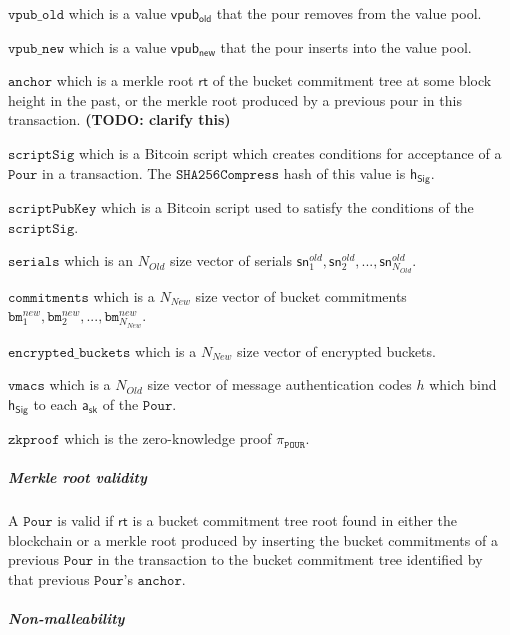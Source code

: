 \documentclass[8pt]{article}
\newcommand{\SpendAuthorityPrivate}{\mathsf{a_{sk}}}
\newcommand{\SHA}{\mathtt{SHA256Compress}}
\newcommand{\bm}{\mathbf{\mathtt{bm}}}
\newcommand{\Pour}{\mathtt{Pour}}
\newcommand{\sn}{\mathsf{sn}}
\newcommand{\vpubOld}{\mathtt{vpub\_old}}
\newcommand{\vpubNew}{\mathtt{vpub\_new}}
\newcommand{\anchor}{\mathtt{anchor}}
\newcommand{\scriptSig}{\mathtt{scriptSig}}
\newcommand{\scriptPubKey}{\mathtt{scriptPubKey}}
\newcommand{\serials}{\mathtt{serials}}
\newcommand{\commitments}{\mathtt{commitments}}
\newcommand{\encryptedBuckets}{\mathtt{encrypted\_buckets}}
\newcommand{\rt}{\mathsf{rt}}
\newcommand{\hSig}{\mathsf{h_{Sig}}}
\newcommand{\Nold}{N_{Old}}
\newcommand{\Nnew}{N_{New}}
\newcommand{\vmacs}{\mathtt{vmacs}}
\newcommand{\zkproof}{\mathtt{zkproof}}
\newcommand{\PourStatement}{\texttt{POUR}}
\newcommand{\PourProof}{\pi_{\PourStatement}}
\newcommand{\vpubold}{\mathsf{vpub_{old}}}
\newcommand{\vpubnew}{\mathsf{vpub_{new}}}
\begin{document}
\begin{list}{}{}

\item $\vpubOld$ which is a value $\vpubold$ that the pour removes from the value pool.

\item $\vpubNew$ which is a value $\vpubnew$ that the pour inserts into the value pool.

\item $\anchor$ which is a merkle root $\rt$ of the bucket commitment tree at some block height in the past, or the merkle root produced by a previous pour in this transaction. \textbf{(TODO: clarify this)}

\item $\scriptSig$ which is a Bitcoin script which creates conditions for acceptance of a $\Pour$ in a transaction. The $\SHA$ hash of this value is $\hSig$.

\item $\scriptPubKey$ which is a Bitcoin script used to satisfy the conditions of the $\scriptSig$.

\item $\serials$ which is an $\Nold$ size vector of serials $\sn^{old}_{1}, \sn^{old}_{2}, ..., \sn^{old}_{\Nold}$.

\item $\commitments$ which is a $\Nnew$ size vector of bucket commitments $\bm^{new}_{1}, \bm^{new}_{2}, ..., \bm^{new}_{\Nnew}$.

\item $\encryptedBuckets$ which is a $\Nnew$ size vector of encrypted buckets.

\item $\vmacs$ which is a $\Nold$ size vector of message authentication codes $h$ which bind $\hSig$ to each $\SpendAuthorityPrivate$ of the $\Pour$.

\item $\zkproof$ which is the zero-knowledge proof $\PourProof$.

\end{list}

\subparagraph{Merkle root validity}

A $\Pour$ is valid if $\rt$ is a bucket commitment tree root found in either the blockchain or a merkle root produced by inserting the bucket commitments of a previous $\Pour$ in the transaction to the bucket commitment tree identified by that previous $\Pour$'s $\anchor$.

\subparagraph{Non-malleability}
\end{document}
